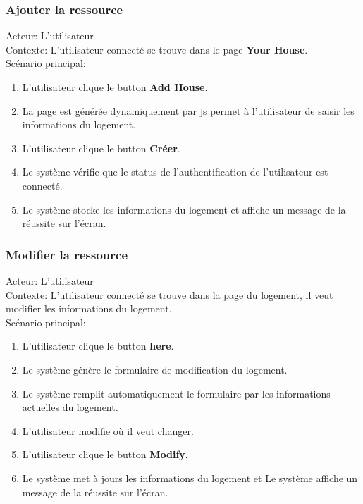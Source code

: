 \documentclass[14px]{article}
\begin{document}
\subsubsection{Ajouter la ressource}
Acteur: L'utilisateur\\
Contexte: L'utilisateur connecté se trouve dans le page \textbf{Your House}.\\
Scénario principal:
\begin{enumerate}
	\item L'utilisateur clique le button \textbf{Add House}.
	\item La page est générée dynamiquement par js permet à l'utilisateur de saisir les informations du logement.
	\item L'utilisateur clique le button \textbf{Créer}.
	\item Le système vérifie que le status de l'authentification de l'utilisateur est connecté.
	\item Le système stocke les informations du logement et affiche un message de la réussite sur l'écran.
\end{enumerate}

\subsubsection{Modifier la ressource}
Acteur: L'utilisateur\\
Contexte: L'utilisateur connecté se trouve dans la page du logement, il veut modifier les informations du logement.\\
Scénario principal:
\begin{enumerate}
	\item L'utilisateur clique le button \textbf{here}.
	\item Le système génère le formulaire de modification du logement.
	\item Le système remplit automatiquement le formulaire par les informations actuelles du logement.
	\item L'utilisateur modifie où il veut changer.
	\item L'utilisateur clique le button \textbf{Modify}.
	\item Le système met à jours les informations du logement et Le système affiche un message de la réussite sur l'écran.
\end{enumerate}
\end{document}
